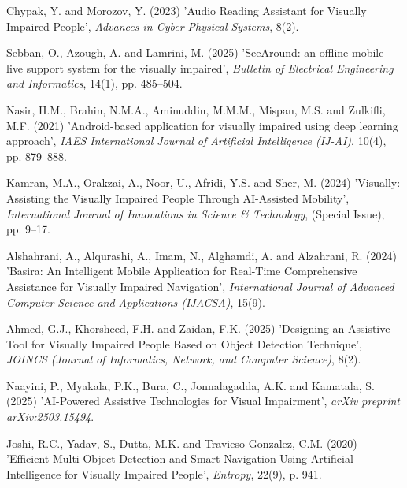 \documentclass[12pt,a4paper]{report}
\begin{document}
 
\begin{enumerate}[label={[\arabic*]}, leftmargin=3em, itemsep=1em]
 
   \item \label{ref:chypak} Chypak, Y. and Morozov, Y. (2023) 'Audio Reading Assistant for Visually Impaired People', \textit{Advances in Cyber-Physical Systems}, 8(2).
 
    \item \label{ref:sebban} Sebban, O., Azough, A. and Lamrini, M. (2025) 'SeeAround: an offline mobile live support system for the visually impaired', \textit{Bulletin of Electrical Engineering and Informatics}, 14(1), pp. 485--504.
 
    \item \label{ref:nasir} Nasir, H.M., Brahin, N.M.A., Aminuddin, M.M.M., Mispan, M.S. and Zulkifli, M.F. (2021) 'Android-based application for visually impaired using deep learning approach', \textit{IAES International Journal of Artificial Intelligence (IJ-AI)}, 10(4), pp. 879--888.
 
    \item \label{ref:kamran} Kamran, M.A., Orakzai, A., Noor, U., Afridi, Y.S. and Sher, M. (2024) 'Visually: Assisting the Visually Impaired People Through AI-Assisted Mobility', \textit{International Journal of Innovations in Science \& Technology}, (Special Issue), pp. 9--17.
 
    \item \label{ref:alshahrani} Alshahrani, A., Alqurashi, A., Imam, N., Alghamdi, A. and Alzahrani, R. (2024) 'Basira: An Intelligent Mobile Application for Real-Time Comprehensive Assistance for Visually Impaired Navigation', \textit{International Journal of Advanced Computer Science and Applications (IJACSA)}, 15(9).
 
    \item Ahmed, G.J., Khorsheed, F.H. and Zaidan, F.K. (2025) 'Designing an Assistive Tool for Visually Impaired People Based on Object Detection Technique', \textit{JOINCS (Journal of Informatics, Network, and Computer Science)}, 8(2).
 
    \item Naayini, P., Myakala, P.K., Bura, C., Jonnalagadda, A.K. and Kamatala, S. (2025) 'AI-Powered Assistive Technologies for Visual Impairment', \textit{arXiv preprint arXiv:2503.15494}.
    
    \item Joshi, R.C., Yadav, S., Dutta, M.K. and Travieso-Gonzalez, C.M. (2020) 'Efficient Multi-Object Detection and Smart Navigation Using Artificial Intelligence for Visually Impaired People', \textit{Entropy}, 22(9), p. 941.
 

\end{enumerate}
\end{document}
